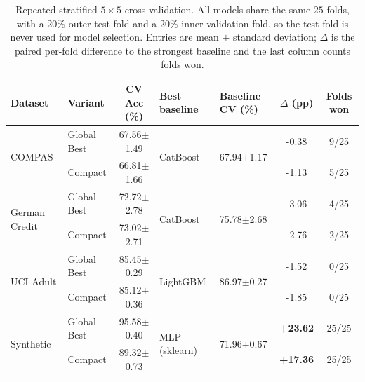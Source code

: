 \begin{table}[t]
\centering
\caption{Repeated stratified $5\times5$ cross-validation. All models share the same $25$ folds, with a 20\% outer test fold and a 20\% inner validation fold, so the test fold is never used for model selection. Entries are mean $\pm$ standard deviation; $\Delta$ is the paired per-fold difference to the strongest baseline and the last column counts folds won.}
\label{tab:cross_validation}
\setlength{\tabcolsep}{4pt}
\begin{tabular}{ll c ll c c}
\toprule
\textbf{Dataset} & \textbf{Variant} & \textbf{CV Acc (\%)} & \textbf{Best baseline} & \textbf{Baseline CV (\%)} & \textbf{$\Delta$ (pp)} & \textbf{Folds won} \\
\midrule
\multirow{2}{*}{COMPAS} & Global Best & 67.56$\pm$1.49 & \multirow{2}{*}{CatBoost} & \multirow{2}{*}{67.94$\pm$1.17} & -0.38 & 9/25 \\
 & Compact & 66.81$\pm$1.66 &  &  & -1.13 & 5/25 \\
\midrule
\multirow{2}{*}{German Credit} & Global Best & 72.72$\pm$2.78 & \multirow{2}{*}{CatBoost} & \multirow{2}{*}{75.78$\pm$2.68} & -3.06 & 4/25 \\
 & Compact & 73.02$\pm$2.71 &  &  & -2.76 & 2/25 \\
\midrule
\multirow{2}{*}{UCI Adult} & Global Best & 85.45$\pm$0.29 & \multirow{2}{*}{LightGBM} & \multirow{2}{*}{86.97$\pm$0.27} & -1.52 & 0/25 \\
 & Compact & 85.12$\pm$0.36 &  &  & -1.85 & 0/25 \\
\midrule
\multirow{2}{*}{Synthetic} & Global Best & 95.58$\pm$0.40 & \multirow{2}{*}{MLP (sklearn)} & \multirow{2}{*}{71.96$\pm$0.67} & \textbf{+23.62} & 25/25 \\
 & Compact & 89.32$\pm$0.73 &  &  & \textbf{+17.36} & 25/25 \\
\bottomrule
\end{tabular}
\end{table}
